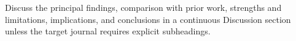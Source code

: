 Discuss the principal findings, comparison with prior work, strengths and limitations, implications, and conclusions in a continuous Discussion section unless the target journal requires explicit subheadings.
